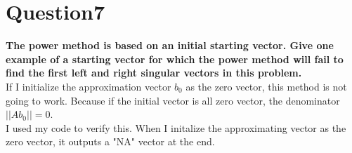 \documentclass[paper=a4, fontsize=11pt]{scrartcl} %
\numberwithin{equation}{section} %
\numberwithin{figure}{section} %
\numberwithin{table}{section} %
\begin{document}
\newpage
\section*{Question7}
\textbf{The power method is based on an initial starting vector. Give one example of a starting vector for which the power method will fail to find the first left and right singular vectors in this problem.}\\

If I initialize the approximation vector $b_0$ as the zero vector, this method is not going to work. Because if the initial vector is all zero vector, the denominator $||Ab_0|| = 0 $. \\

I used my code to verify this. When I initalize the approximating vector as the zero vector, it outputs a "NA" vector at the end. 
\end{document}
